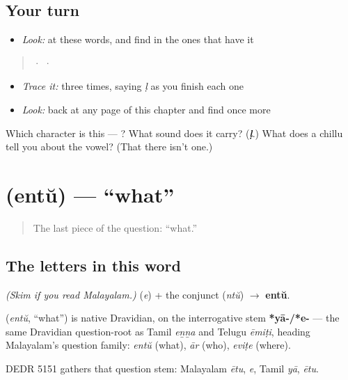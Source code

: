 \subsection*{Your turn}
\begin{itemize}
\raggedright
  \item \emph{Look:} at these words, and find  in the ones that have it
\end{itemize}

\begin{quote}
  ·    ·  
\end{quote}

\begin{itemize}
\raggedright
  \item \emph{Trace it:}  three times, saying \emph{ḷ} as you finish each one
  \item \emph{Look:} back at any page of this chapter and find  once more
\end{itemize}

\begin{tcolorbox}[breakable,colback=teal!4,colframe=teal!35!black,title={Before you move on}]
Which character is this — ? What sound does it carry? (\emph{\textbf{ḷ}}.) What does a chillu tell you about the vowel? (That there isn't one.)
\end{tcolorbox}
\section[\texorpdfstring{\ml{എന്ത്} (entŭ)}{എന്ത് (entŭ)}]{ (entŭ) — \textquotedblleft{}what\textquotedblright{}}

\label{lesson:ML-C02-entu}



\begin{quote}
The last piece of the question: \textquotedblleft{}what.\textquotedblright{}
\end{quote}

\subsection*{The letters in this word}
\emph{(Skim if you read Malayalam.)} \textbf{} (\emph{e}) + the conjunct \textbf{} (\emph{ntŭ}) $\to$ \textbf{entŭ}.

\begin{cousinweb}
\textbf{} (\emph{entŭ}, \textquotedblleft{}what\textquotedblright{}) is native Dravidian, on the interrogative stem \textbf{*yā-/*e-} — the same Dravidian question-root as Tamil \emph{eṉṉa} and Telugu \emph{ēmiṭi}, heading Malayalam's question family: \emph{entŭ} (what), \emph{ār} (who), \emph{eviṭe} (where).

DEDR 5151 gathers that question stem: Malayalam \emph{ētu}, \emph{e}, Tamil \emph{yā}, \emph{ētu}.
\end{cousinweb}


